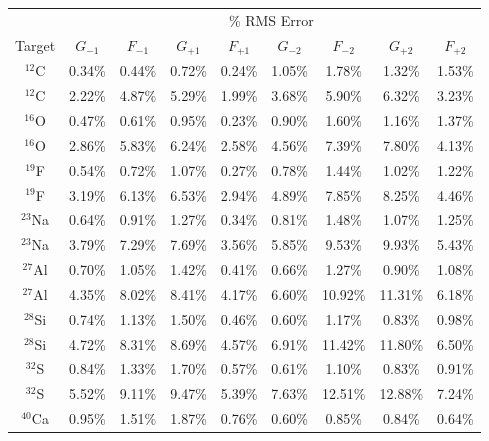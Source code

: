 \documentclass{book}[letterpaper,12pt]
\begin{document}
\begin{table}
\centering
\begin{tabular}{ccccccccc}
\hline
\hline
& \multicolumn{8}{c}{\% RMS Error}\\
Target & $G_{-1}$ & $F_{-1}$ & $G_{+1}$ & $F_{+1}$ & $G_{-2}$ & $F_{-2}$ & $G_{+2}$ & $F_{+2}$ \\
\hline
$^{12}$C & 0.34\% & 0.44\% & 0.72\% & 0.24\% & 1.05\% & 1.78\% & 	1.32\% & 1.53\% \\
\vspace*{2mm}
$^{12}$C & 2.22\% & 4.87\% & 5.29\% & 1.99\% & 3.68\% & 5.90\% & 6.32\% & 3.23\% \\
$^{16}$O & 0.47\% & 0.61\% & 0.95\% & 0.23\% & 0.90\% & 1.60\% & 1.16\% & 1.37\% \\
\vspace*{2mm}
$^{16}$O & 2.86\% & 5.83\% & 6.24\% & 2.58\% & 4.56\% & 7.39\% & 7.80\% & 4.13\% \\
$^{19}$F & 0.54\% & 0.72\% & 1.07\% & 0.27\% & 0.78\% & 1.44\% & 1.02\% & 1.22\% \\
\vspace*{2mm}
$^{19}$F & 3.19\% & 6.13\% & 6.53\% & 2.94\% & 4.89\% & 7.85\% & 8.25\% & 4.46\% \\
$^{23}$Na & 0.64\% & 0.91\% & 1.27\% & 0.34\% & 0.81\% & 1.48\% & 1.07\% & 1.25\% \\
\vspace*{2mm}
$^{23}$Na & 3.79\% & 7.29\% & 7.69\% & 3.56\% & 5.85\% & 9.53\% & 9.93\% & 5.43\% \\
$^{27}$Al & 0.70\% & 1.05\% & 1.42\% & 0.41\% & 0.66\% & 1.27\% & 0.90\% & 1.08\% \\
\vspace*{2mm}
$^{27}$Al & 4.35\% & 8.02\% & 8.41\% & 4.17\% & 6.60\% & 10.92\% & 11.31\% & 6.18\% \\
$^{28}$Si & 0.74\% & 1.13\% & 1.50\% & 0.46\% & 0.60\% & 1.17\% & 0.83\% & 0.98\% \\
\vspace*{2mm}
$^{28}$Si & 4.72\% & 8.31\% & 8.69\% & 4.57\% & 6.91\% & 11.42\% & 11.80\% & 6.50\% \\
$^{32}$S & 0.84\% & 1.33\% & 1.70\% & 0.57\% & 0.61\% & 1.10\% & 0.83\% & 0.91\% \\
\vspace*{2mm}
$^{32}$S & 5.52\% & 9.11\% & 9.47\% & 5.39\% & 7.63\% & 12.51\% & 12.88\% & 7.24\% \\
$^{40}$Ca & 0.95\% & 1.51\% & 1.87\% & 0.76\% & 0.60\% & 0.85\% & 0.84\% & 0.64\% \\

\end{tabular}
\end{table}
\end{document}
